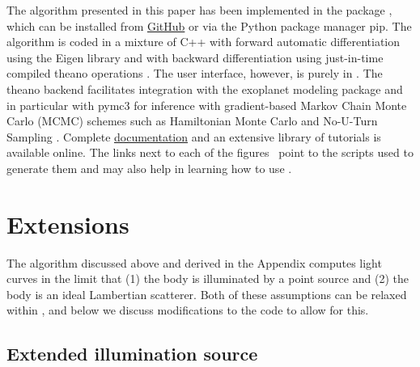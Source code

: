\documentclass[modern]{aastex62}
\begin{document}
The algorithm presented in this paper has been implemented in the \Python
package \starry, which can be installed from
\href{https://github.com/rodluger/starry}{GitHub} or via the Python package
manager \textsf{pip}. The algorithm is coded in a mixture of \textsf{C++}
with forward automatic differentiation using the \textsf{Eigen} library
\citep{eigen} and \Python with backward differentiation using
just-in-time compiled \textsf{theano}
operations \citep{theano}. The user interface, however, is purely in
\Python. The \textsf{theano} backend facilitates integration with the
\textsf{exoplanet} modeling package \citep{exoplanet} and in particular
with \textsf{pymc3} \citep{pymc3} for inference with gradient-based
Markov Chain Monte Carlo (MCMC) schemes
such as Hamiltonian Monte Carlo \citep[HMC;][]{Duane1987}
and No-U-Turn Sampling \citep[NUTS;][]{Hoffman2011}.
%
Complete \href{https://starry.readthedocs.io}{documentation} and an
extensive library of tutorials is available online.
The links next to each
of the figures \codeicon\, point to the \Python scripts used to generate
them and may also help in learning how to use \starry.

\section{Extensions}
\label{sec:extensions}

The algorithm discussed above and derived in the Appendix computes light
curves in the limit that (1) the body is illuminated by a point source
and (2) the body is an ideal Lambertian scatterer. Both of these
assumptions can be relaxed within \starry, and below we discuss modifications
to the code to allow for this.

\subsection{Extended illumination source}
\label{sec:extended}
\end{document}
